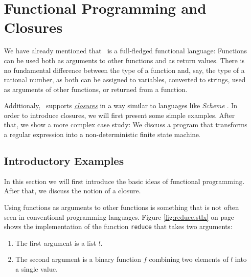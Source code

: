 \chapter{Functional Programming and Closures \label{chapter:closures}}
We have already mentioned that \setlx\ is a full-fledged functional language:
Functions can be used both as arguments to other functions and as return values.  There is
no fundamental difference between the type of a function and, say, the type of a rational
number, as both can be assigned to variables, converted to strings, used as arguments of other
functions, or returned from a function.  

Additionaly, \setlx\ supports
\href{http://en.wikipedia.org/wiki/Closure_(computer_science)}{\emph{closures}}
in a way similar to languages like \textsl{Scheme} \cite{sussman:75}. 
In order to introduce closures, we will first present some simple examples.  After that, we show
a more complex case study: We discuss a program that transforms a regular expression into a
non-deterministic finite state machine.

\section{Introductory Examples}
In this section we will first introduce the basic ideas of functional programming.
After that, we discuss the notion of a closure.

Using functions as arguments to other functions is something that is not often seen in
conventional programming languages.  Figure \ref{fig:reduce.stlx} on page \pageref{fig:reduce.stlx}
shows the implementation of the function \texttt{reduce} that takes two arguments:
\begin{enumerate}
\item The first argument is a list $l$.
\item The second argument is a binary function $f$ combining two elements of $l$ into a single value.
\end{enumerate}

